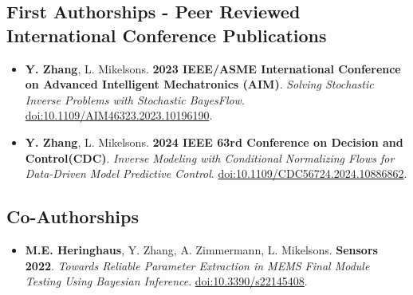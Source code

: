 \subsection*{First Authorships - Peer Reviewed International Conference Publications} \label{sec:publications:peer_reviewed_conf_first}

\begin{itemize}
    \item[] \textbf{Y. Zhang}, L. Mikelsons. \textbf{2023 IEEE/ASME International Conference on Advanced Intelligent Mechatronics (AIM)}. \textit{Solving Stochastic Inverse Problems with Stochastic BayesFlow}. \url{doi:10.1109/AIM46323.2023.10196190}.
    \item[] \textbf{Y. Zhang}, L. Mikelsons. \textbf{2024 IEEE 63rd Conference on Decision and Control(CDC)}. \textit{Inverse Modeling with Conditional Normalizing Flows for Data-Driven Model Predictive Control}. \url{doi:10.1109/CDC56724.2024.10886862}.
\end{itemize}

\subsection*{Co-Authorships} \label{sec:publications:other_co}

\begin{itemize}
    \item[] \textbf{M.E. Heringhaus}, Y. Zhang, A. Zimmermann, L. Mikelsons. \textbf{Sensors 2022}. \textit{Towards Reliable Parameter Extraction in MEMS Final Module Testing Using Bayesian Inference}. \url{doi:10.3390/s22145408}.
\end{itemize}
